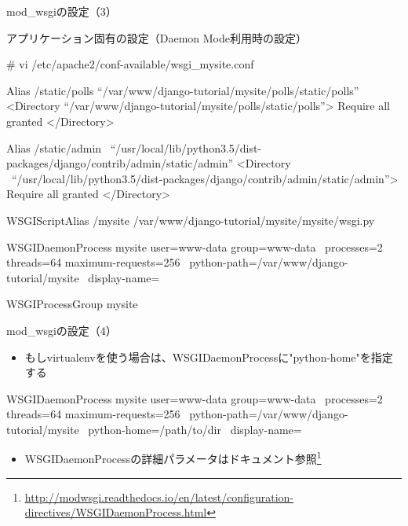 \begin{frame}[containsverbatim]{mod\_wsgiの設定（3）}

アプリケーション固有の設定（Daemon Mode利用時の設定）

\begin{commandlinesmall}
# vi /etc/apache2/conf-available/wsgi_mysite.conf

Alias /static/polls ``/var/www/django-tutorial/mysite/polls/static/polls''
<Directory ``/var/www/django-tutorial/mysite/polls/static/polls''>
  Require all granted
</Directory>

Alias /static/admin \
``/usr/local/lib/python3.5/dist-packages/django/contrib/admin/static/admin''
<Directory \
``/usr/local/lib/python3.5/dist-packages/django/contrib/admin/static/admin''>
  Require all granted
</Directory>
    
WSGIScriptAlias /mysite /var/www/django-tutorial/mysite/mysite/wsgi.py

WSGIDaemonProcess mysite user=www-data group=www-data \
processes=2 threads=64 maximum-requests=256 \
python-path=/var/www/django-tutorial/mysite \
display-name=%

WSGIProcessGroup  mysite
\end{commandlinesmall}

\end{frame}


\begin{frame}[containsverbatim]{mod\_wsgiの設定（4）}

\begin{itemize}
\item もしvirtualenvを使う場合は、WSGIDaemonProcessに"python-home"を指定する
\end{itemize}  

\begin{commandlinesmall}
WSGIDaemonProcess mysite user=www-data group=www-data \
processes=2 threads=64 maximum-requests=256 \
python-path=/var/www/django-tutorial/mysite \
python-home=/path/to/dir \
display-name=%
\end{commandlinesmall}

\begin{itemize}
\item WSGIDaemonProcessの詳細パラメータはドキュメント参照\footnote{\url{http://modwsgi.readthedocs.io/en/latest/configuration-directives/WSGIDaemonProcess.html}}
\end{itemize}
    
\end{frame}



